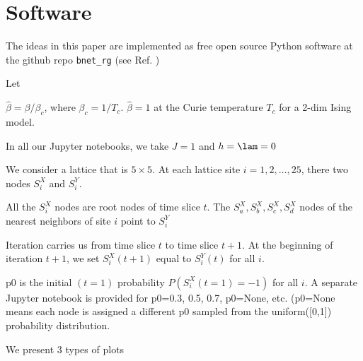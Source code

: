 \section{Software}

The ideas in this paper
are implemented as free
open source Python software
at the github repo {\tt bnet\_rg}
(see Ref. \cite{bnetrg})

Let

$\hat{\beta} =\beta/\beta_c$, where $\beta_c= 1/T_c$. 
$\hat{\beta}=1$ at the Curie temperature $T_c$
for a 2-dim Ising model.

In all our Jupyter notebooks, we take $J=1$ and $h = \lam = 0$

We consider a lattice that is $5 \times 5$. At each lattice site $i=1,2, \ldots, 25$, there 
two nodes $S_i^X$ and $S_i^Y$. 

All the $S_i^X$ nodes are root nodes of time slice $t$. The $S_a^X, S_b^X, S_c^X, S_d^X$ nodes of the nearest neighbors of site $i$ point to $S_i^Y$

Iteration carries us from time slice $t$ to time slice $t+1$. At the beginning of iteration $ t+1$, we set
$S_i^X(t+1)$ equal to $S_i^Y(t)$ for all $i$.

p0 is the initial $(t=1)$ probability $P(S_i^X(t=1)=-1)$ for all $i$. A separate
Jupyter notebook is provided for p0=0.3, 0.5, 0.7, p0=None, etc. (p0=None means each node is assigned a different p0 sampled from the 
uniform([0,1]) probability distribution.

We present 3 types of plots

